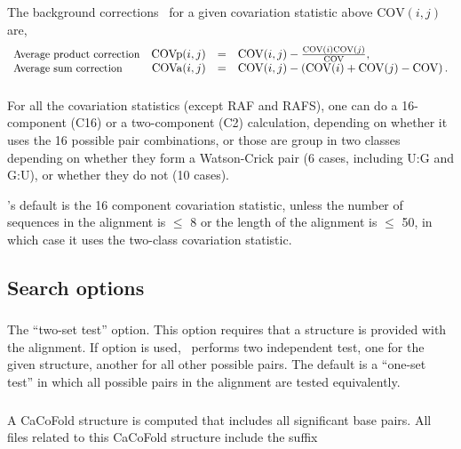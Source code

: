 The background corrections~\citep{DunnGloor07} for a given
covariation statistic above $\mathrm{COV}(i,j)$ are,
%
\[
\begin{array}{lrcl}
  \mbox{\small Average product correction} & \mathrm{COVp}(i,j) & = &  \mathrm{COV}(i,j) - \frac { \mathrm{COV}(i) \mathrm{COV}(j) } { \mathrm{COV} }, \\
  \mbox{\small Average sum correction}     & \mathrm{COVa}(i,j) & = &  \mathrm{COV}(i,j) - \left( \mathrm{COV}(i) + \mathrm{COV}(j) - \mathrm{COV} \right). \\
\end{array}
\]



\subsubsection{}
For all the covariation statistics (except RAF and RAFS), one can do a
16-component (C16) or a two-component (C2) calculation, depending on
whether it uses the 16 possible pair combinations, or those are group
in two classes depending on whether they form a Watson-Crick pair (6
cases, including U:G and G:U), or whether they do not (10 cases).

\rscape's default is the 16 component covariation statistic, unless
the number of sequences in the alignment is $\leq$ 8 or the length of
the alignment is $\leq$ 50, in which case it uses the two-class
covariation statistic.

\subsection{Search options}


\subsubsection{} The ``two-set test'' option.
This option requires that a structure is provided with the alignment.
If option  is used, \rscape\ performs two independent test,
one for the given structure, another for all other possible pairs.
The default is a ``one-set test'' in which all possible pairs in the
alignment are tested equivalently.


\subsubsection{} A CaCoFold structure is computed that includes all significant base pairs. All files related to this 
CaCoFold structure include the suffix 

